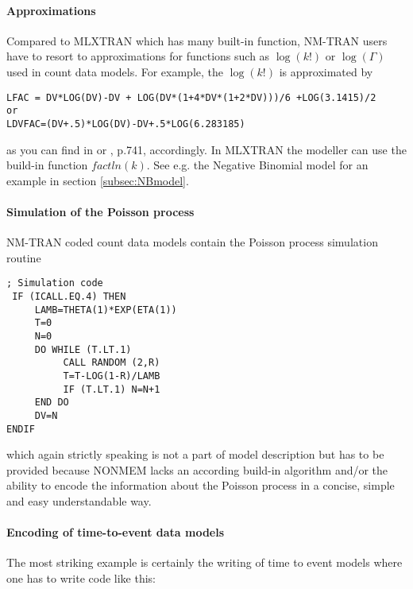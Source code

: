 \paragraph{Approximations}
Compared to MLXTRAN which has many built-in function, NM-TRAN users have to 
resort to approximations for functions such as $\log(k!)$ or $\log(\Gamma)$ used in 
count data models. For example, the $\log(k!)$ is approximated by\\

\myStartLine

\lstset{language=NONMEMdataSet}
\begin{lstlisting}
LFAC = DV*LOG(DV)-DV + LOG(DV*(1+4*DV*(1+2*DV)))/6 +LOG(3.1415)/2
or
LDVFAC=(DV+.5)*LOG(DV)-DV+.5*LOG(6.283185)
\end{lstlisting}

\myEndLine

as you can find in \cite{Plan:2009fk} or \cite{Ette:2007uq}, p.741, accordingly. In MLXTRAN 
the modeller can use the build-in function $factln(k)$. See e.g. the Negative Binomial model 
for an example in section \ref{subsec:NBmodel}. 

\paragraph{Simulation of the Poisson process}
NM-TRAN coded count data models contain the Poisson process simulation routine


\myStartLine

  \lstset{language=NONMEMdataSet}
\begin{lstlisting}
; Simulation code 
 IF (ICALL.EQ.4) THEN
     LAMB=THETA(1)*EXP(ETA(1)) 	
     T=0 
     N=0 
     DO WHILE (T.LT.1)
          CALL RANDOM (2,R) 
          T=T-LOG(1-R)/LAMB 
          IF (T.LT.1) N=N+1
     END DO
     DV=N 
ENDIF
\end{lstlisting}

\myEndLine

which again strictly speaking is not a part of model description but has to be provided because 
NONMEM lacks an according build-in algorithm and/or the ability to encode the information about the 
Poisson process in a concise, simple and easy understandable way. 

\paragraph{Encoding of time-to-event data models}
The most striking example is certainly the writing of time to event models where one has 
to write code like this:
 
